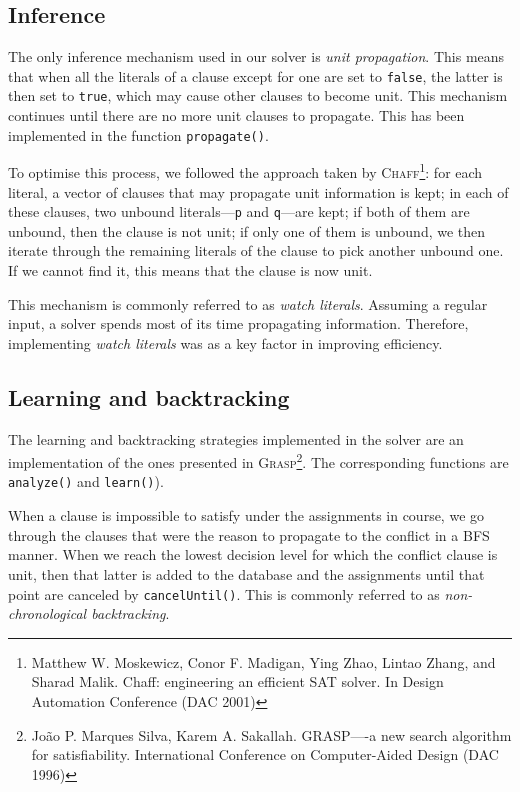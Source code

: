 \subsection{Inference}
The only inference mechanism used in our solver is \textit{unit propagation}. This means that when all the literals of a clause except for one are set to \texttt{false}, the latter is then set to \texttt{true}, which may cause other clauses to become unit. This mechanism continues until there are no more unit clauses to propagate. This has been implemented in the function \texttt{propagate()}.

To optimise this process, we followed the approach taken by \textsc{Chaff}\footnote{Matthew W. Moskewicz, Conor F. Madigan, Ying Zhao, Lintao Zhang, and Sharad Malik. Chaff: engineering an efficient SAT solver. In Design Automation Conference (DAC 2001)}: for each literal, a vector of clauses that may propagate unit information is kept; in each of these clauses, two unbound literals---\texttt{p} and \texttt{q}---are kept; if both of them are unbound, then the clause is not unit; if only one of them is unbound, we then iterate through the remaining literals of the clause to pick another unbound one. If we cannot find it, this means that the clause is now unit.

This mechanism is commonly referred to as \textit{watch literals}. Assuming a regular input, a solver spends most of its time propagating information. Therefore, implementing \textit{watch literals} was as a key factor in improving efficiency.
    
\subsection{Learning and backtracking}
The learning and backtracking strategies implemented in the solver are an implementation of the ones presented in \textsc{Grasp}\footnote{João P. Marques Silva, Karem A. Sakallah. GRASP—-a new search algorithm for satisfiability. International Conference on Computer-Aided Design (DAC 1996)}. The corresponding functions are \texttt{analyze()} and \texttt{learn()}).
    
When a clause is impossible to satisfy under the assignments in course, we go through the clauses that were the reason to propagate to the conflict in a BFS manner. When we reach the lowest decision level for which the conflict clause is unit, then that latter is added to the database and the assignments until that point are canceled by \texttt{cancelUntil()}. This is commonly referred to as \textit{non-chronological backtracking}.
    
